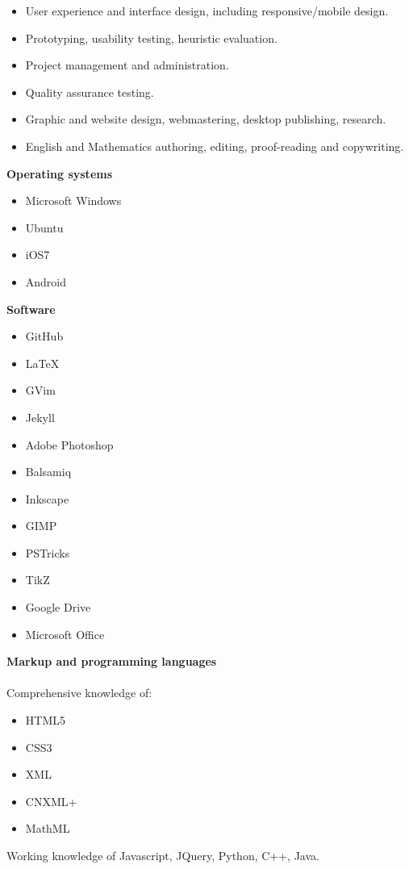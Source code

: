 \documentclass[]{friggeri-cv} %
\begin{document}
\begin{itemize}
\item User experience and interface design, including responsive/mobile design.
\item Prototyping, usability testing, heuristic evaluation.
\item Project management and administration.
\item Quality assurance testing.
\item Graphic and website design, webmastering, desktop publishing, research.
\item English and Mathematics authoring, editing, proof-reading and copywriting.

\end{itemize}

\textbf{Operating systems}
\begin{multicols}{2}
\begin{itemize}
 \item Microsoft Windows
 \item Ubuntu
 \item iOS7
 \item Android
\end{itemize}
\end{multicols}

\textbf{Software}
\begin{multicols}{2}
\begin{itemize}
 \item GitHub
 \item LaTeX
 \item GVim
 \item Jekyll
  \item Adobe Photoshop
 \item Balsamiq
 \item Inkscape
 \item GIMP
 \item PSTricks
 \item TikZ
 \item Google Drive
 \item Microsoft Office
\end{itemize}
\end{multicols}

\textbf{Markup and programming languages}\\
\\
Comprehensive knowledge of: 
\begin{itemize}
 \item HTML5
 \item CSS3
 \item XML
 \item CNXML+
 \item MathML
 \end{itemize}
Working knowledge of Javascript, JQuery, Python, C++, Java.
\end{document}

